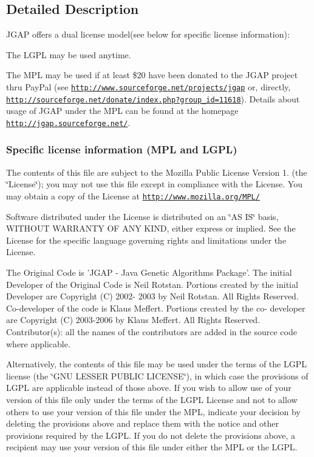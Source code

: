 \subsection{Detailed Description}
J\-G\-A\-P offers a dual license model(see below for specific license information)\-:
\begin{DoxyItemize}
\item The L\-G\-P\-L may be used anytime.
\item The M\-P\-L may be used if at least \$20 have been donated to the J\-G\-A\-P project thru Pay\-Pal (see \href{http://www.sourceforge.net/projects/jgap}{\tt http\-://www.\-sourceforge.\-net/projects/jgap} or, directly, \href{http://sourceforge.net/donate/index.php?group_id=11618}{\tt http\-://sourceforge.\-net/donate/index.\-php?group\-\_\-id=11618}). Details about usage of J\-G\-A\-P under the M\-P\-L can be found at the homepage \href{http://jgap.sourceforge.net/}{\tt http\-://jgap.\-sourceforge.\-net/}.
\end{DoxyItemize}

\subsubsection*{Specific license information (M\-P\-L and L\-G\-P\-L) }

The contents of this file are subject to the Mozilla Public License Version 1. (the \char`\"{}\-License\char`\"{}); you may not use this file except in compliance with the License. You may obtain a copy of the License at \href{http://www.mozilla.org/MPL/}{\tt http\-://www.\-mozilla.\-org/\-M\-P\-L/}

Software distributed under the License is distributed on an \char`\"{}\-A\-S I\-S\char`\"{} basis, W\-I\-T\-H\-O\-U\-T W\-A\-R\-R\-A\-N\-T\-Y O\-F A\-N\-Y K\-I\-N\-D, either express or implied. See the License for the specific language governing rights and limitations under the License.

The Original Code is 'J\-G\-A\-P -\/ Java Genetic Algorithms Package'. The initial Developer of the Original Code is Neil Rotstan. Portions created by the initial Developer are Copyright (C) 2002-\/ 2003 by Neil Rotstan. All Rights Reserved. Co-\/developer of the code is Klaus Meffert. Portions created by the co-\/ developer are Copyright (C) 2003-\/2006 by Klaus Meffert. All Rights Reserved. Contributor(s)\-: all the names of the contributors are added in the source code where applicable.

Alternatively, the contents of this file may be used under the terms of the L\-G\-P\-L license (the \char`\"{}\-G\-N\-U L\-E\-S\-S\-E\-R P\-U\-B\-L\-I\-C L\-I\-C\-E\-N\-S\-E\char`\"{}), in which case the provisions of L\-G\-P\-L are applicable instead of those above. If you wish to allow use of your version of this file only under the terms of the L\-G\-P\-L License and not to allow others to use your version of this file under the M\-P\-L, indicate your decision by deleting the provisions above and replace them with the notice and other provisions required by the L\-G\-P\-L. If you do not delete the provisions above, a recipient may use your version of this file under either the M\-P\-L or the L\-G\-P\-L.

